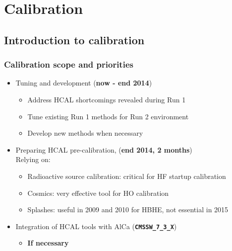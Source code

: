 \documentclass[bigger]{beamer}
\providecommand{\alert}[1]{\textbf{#1}}
\begin{document}
\section{Calibration}
\label{sec-2}
\subsection{Introduction to calibration}
\label{sec-2-1}
\begin{frame}
\frametitle{Calibration scope and priorities}
\label{sec-2-1-1}
\begin{itemize}

\item Tuning and development (\alert{now - end 2014})
\label{sec-2-1-1-1}%
\begin{itemize}

\item Address HCAL shortcomings revealed during Run 1
\label{sec-2-1-1-1-1}%

\item Tune existing Run 1 methods for Run 2 environment
\label{sec-2-1-1-1-2}%

\item Develop new methods when necessary
\label{sec-2-1-1-1-3}%
\end{itemize} %

\item Preparing HCAL pre-calibration, (\alert{end 2014, 2 months})\\
\label{sec-2-1-1-2}%
Relying on:
\begin{itemize}

\item Radioactive source calibration: critical for HF startup calibration
\label{sec-2-1-1-2-1}%

\item Cosmics: very effective tool for HO calibration
\label{sec-2-1-1-2-2}%

\item Splashes: useful in 2009 and 2010 for HBHE, not essential in 2015
\label{sec-2-1-1-2-3}%
\end{itemize} %

\item Integration of HCAL tools with AlCa (\alert{\texttt{CMSSW\_7\_3\_X}})
\label{sec-2-1-1-3}%
\begin{itemize}

\item \alert{If necessary}
\label{sec-2-1-1-3-1}%
\end{itemize} %
\end{itemize} %
\end{frame}
\end{document}
